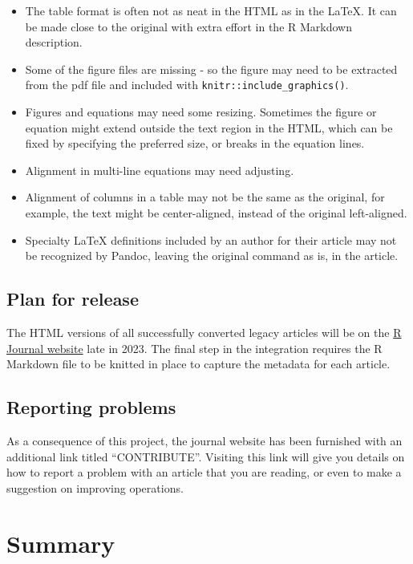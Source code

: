 \begin{itemize}
\tightlist
\item
  The table format is often not as neat in the HTML as in the LaTeX. It can be made close to the original with extra effort in the R Markdown description.
\item
  Some of the figure files are missing - so the figure may need to be extracted from the pdf file and included with \texttt{knitr::include\_graphics()}.
\item
  Figures and equations may need some resizing. Sometimes the figure or equation might extend outside the text region in the HTML, which can be fixed by specifying the preferred size, or breaks in the equation lines.
\item
  Alignment in multi-line equations may need adjusting.
\item
  Alignment of columns in a table may not be the same as the original, for example, the text might be center-aligned, instead of the original left-aligned.
\item
  Specialty LaTeX definitions included by an author for their article may not be recognized by Pandoc, leaving the original command as is, in the article.
\end{itemize}

\subsection{Plan for release}\label{plan-for-release}

The HTML versions of all successfully converted legacy articles will be on the \href{https://journal.r-project.org}{R Journal website} late in 2023. The final step in the integration requires the R Markdown file to be knitted in place to capture the metadata for each article.

\subsection{Reporting problems}\label{reporting-problems}

As a consequence of this project, the journal website has been furnished with an additional link titled ``CONTRIBUTE''. Visiting this link will give you details on how to report a problem with an article that you are reading, or even to make a suggestion on improving operations.

\section{Summary}\label{summary}

